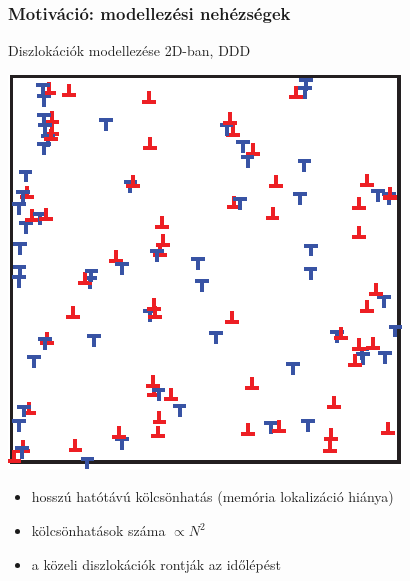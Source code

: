 \documentclass[12pt]{beamer}
\begin{document}
\begin{frame}
\frametitle{Motiváció: modellezési nehézségek}
Diszlokációk modellezése 2D-ban, DDD
  \begin{center}
  \includegraphics[scale=1]{figs/ddd.eps}
  \end{center}
\begin{itemize}
\item hosszú hatótávú kölcsönhatás (memória lokalizáció hiánya)
\item kölcsönhatások száma $\propto N^2$
\item a közeli diszlokációk rontják az időlépést
\end{itemize}
\end{frame}
\end{document}
